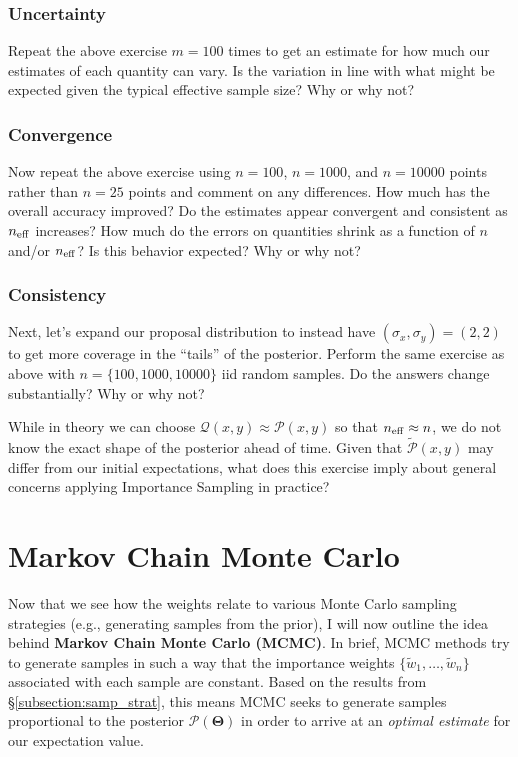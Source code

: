 \documentclass[12pt, titlepage]{article}
\newcommand{\params}{\ensuremath{\boldsymbol\Theta}}
\newcommand{\posterior}{\ensuremath{\mathcal{P}}}
\newcommand{\proposal}{\ensuremath{\mathcal{Q}}}
\begin{document}
\subsubsection*{Uncertainty}

Repeat the above exercise $m=100$ times to get an
estimate for how much our estimates of each quantity can vary.
Is the variation in line with what might be expected given 
the typical effective sample size? Why or why not?

\subsubsection*{Convergence}

Now repeat the above exercise using $n=100$, $n=1000$, and $n=10000$ 
points rather than $n=25$ points and comment on any differences.
How much has the overall accuracy improved? Do
the estimates appear convergent and consistent as $n_{\rm eff}$ increases?
How much do the errors on quantities shrink as a function
of $n$ and/or $n_{\rm eff}$? Is this behavior expected? Why or why not?

\subsubsection*{Consistency}

Next, let's expand our proposal distribution to instead have
$(\sigma_x,\sigma_y)=(2,2)$ to get more coverage in the ``tails'' of the
posterior. Perform the same exercise as above 
with $n=\{100,1000,10000\}$ iid random samples. 
Do the answers change substantially? Why or why not?

While in theory we can choose $\proposal(x,y) \approx \posterior(x,y)$ 
so that $n_{\rm eff} \approx n$, we do not know the exact shape of the posterior 
ahead of time. Given that $\tilde{\posterior}(x,y)$ may differ from
our initial expectations, what does this exercise imply about general concerns
applying Importance Sampling in practice?

\section{Markov Chain Monte Carlo} \label{sec:mcmc}

Now that we see how the weights relate to various Monte Carlo sampling strategies
(e.g., generating samples from the prior), I will now outline
the idea behind \textbf{Markov Chain Monte Carlo (MCMC)}. In brief,
MCMC methods try to generate samples in such a way that the importance
weights $\{ \tilde{w}_1, \dots, \tilde{w}_n \}$ associated with each sample
are constant. Based on the results from \S\ref{subsection:samp_strat}, this
means MCMC seeks to generate samples proportional to
the posterior $\posterior(\params)$ in order to arrive 
at an \textit{optimal estimate} for our expectation value.
\end{document}
